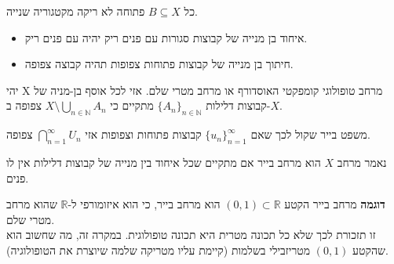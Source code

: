 \documentclass{tstextbook}
\begin{document}
\begin{proposition}
כל \(B\subseteq X\) פתוחה לא ריקה מקטגוריה שנייה.

\end{proposition}
\begin{lemma}
  \begin{itemize}
    \item איחוד בן מנייה של קבוצות סגורות עם פנים ריק יהיה עם פנים ריק.
    \item חיתוך בן מנייה של קבוצות פתוחות צפופות תהיה קבוצה צפופה.
  \end{itemize}
\end{lemma}
\begin{theorem}
יהי X מרחב טופולוגי קומפקטי האוסדורף או מרחב מטרי שלם.
אזי לכל אוסף בן-מניה של קבוצות דלילות \(\{A_{n}\}_{n\in\mathbb{N}}\) מתקיים כי \(X\setminus\bigcup_{n\in\mathbb{N}}A_{n}\) צפופה ב-\(X\).

\end{theorem}
\begin{lemma}
משפט בייר שקול לכך שאם \(\{ u_{n} \}_{n=1}^{\infty}\) קבוצות פתוחות וצפופות אזי \(\bigcap_{n=1}^{\infty} U_{n}\) צפופה.

\end{lemma}
\begin{definition}
נאמר מרחב \(X\) הוא מרחב בייר אם מתקיים שכל איחוד בין מנייה של קבוצות דלילות אין לו פנים.

\end{definition}
\textbf{דוגמה} מרחב בייר
הקטע \((0,1)\subset\mathbb{R}\) הוא מרחב בייר, כי הוא איזומורפי ל-\(\mathbb{R}\) שהוא מרחב מטרי שלם.\\

זו תזכורת לכך שלא כל תכונה מטרית היא תכונה טופולוגית. 
במקרה זה, מה שחשוב הוא שהקטע \((0,1)\) מטריזבילי בשלמות (קיימת עליו מטריקה שלמה שיוצרת את הטופולוגיה).
\end{document}
